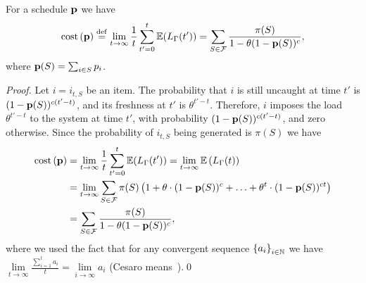 \begin{lemma}\label{lem:explicit}
For a schedule $\mathbf{p}$ we have
$$\text{cost}\left( \mathbf{p} \right) \overset{\mathrm{def}}{=} \lim_{t\rightarrow\infty}\frac{1}{t}\sum_{t'=0}^t\mathbb{E}(L_{\Gamma}(t')) = \sum_{S\in \mathcal{F}} \frac{\pi(S)}{1- \theta(1-\mathbf{p}(S))^c},$$
where $\mathbf{p}(S) = \sum_{i\in S} p_i$.
\end{lemma}
\begin{proof}
Let $i=i_{t, S}$ be an item. The probability that $i$ is still uncaught at time $t'$ is $(1-\mathbf{p}(S))^{c(t'-t)}$, and its freshness at $t'$ is $\theta^{t' - t}$. Therefore, $i$ imposes the load $\theta^{t'-t}$ to the system at time $t'$, with probability $(1-\mathbf{p}(S))^{c(t'-t)}$, and zero otherwise. Since the probability of $i_{t,S}$ being generated is $\pi(S)$ we have
\begin{align*}
 \text{cost}\left( \mathbf{p} \right) &= \lim_{t\rightarrow\infty}\frac{1}{t}\sum_{t'=0}^t\mathbb{E}(L_{\Gamma}(t')) = \lim_{t\rightarrow \infty} \mathbb{E}\left(L_{\Gamma}(t)\right) \\
 &=\lim_{t\rightarrow \infty} \sum_{S\in \mathcal{F}} \pi(S) \left(1 + \theta\cdot(1-\mathbf{p}(S))^c + \ldots + \theta^t\cdot(1-\mathbf{p}(S))^{ct}\right) \\ 
 &=
 \sum_{S\in \mathcal{F}} \frac{\pi(S)}{1-\theta(1-\mathbf{p}(S))^c},
\end{align*}
where we used the fact that for any convergent sequence $\left\{a_i\right\}_{i\in\mathbb{N}}$ we have $\lim\limits_{t\rightarrow\infty}\frac{\sum_{i=1}^t a_i}{t} = \lim\limits_{i\rightarrow\infty}a_i$ (Cesaro means~\cite{hardy1991divergent}).\qed
\end{proof}

